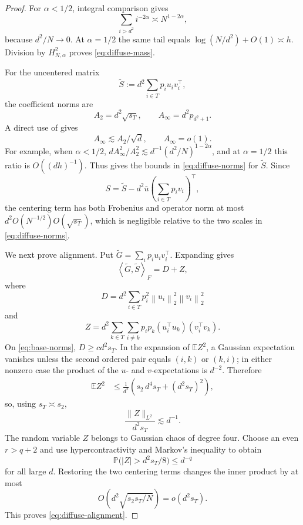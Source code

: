\documentclass[11pt]{article}
\theoremstyle{definition}
\newcommand{\Pp}{\mathbb P}
\newcommand{\Ee}{\mathbb E}
\newcommand{\ip}[2]{\left\langle #1,#2\right\rangle_F}
\newcommand{\norm}[1]{\left\lVert #1\right\rVert_2}
\begin{document}
\begin{proof}
For $\alpha<1/2$, integral comparison gives
\[
 \sum_{i>d^2}i^{-2\alpha}
 \asymp N^{1-2\alpha},
\]
because $d^2/N\to0$.  At $\alpha=1/2$ the same tail equals
$\log(N/d^2)+O(1)\asymp h$.  Division by
$H_{N,\alpha}^2$ proves \eqref{eq:diffuse-mass}.

For the uncentered matrix
\[
 \widetilde S:=d^2\sum_{i\in T}p_i u_iv_i^\top,
\]
the coefficient norms are
\[
 A_2=d^2\sqrt{s_T},
 \qquad A_\infty=d^2p_{d^2+1}.
\]
A direct use of  gives
\begin{equation}
 A_\infty\lesssim A_2/\sqrt d,
 \qquad A_\infty=o(1).
 \label{eq:diffuse-coefficients}
\end{equation}
For example, when $\alpha<1/2$,
$dA_\infty^2/A_2^2\lesssim d^{-1}(d^2/N)^{1-2\alpha}$, and at
$\alpha=1/2$ this ratio is $O((dh)^{-1})$.
Thus  gives the bounds in
\eqref{eq:diffuse-norms} for $\widetilde S$.  Since
\[
 S=\widetilde S-d^2\bar u
 \left(\sum_{i\in T}p_iv_i\right)^\top,
\]
the centering term has both Frobenius and operator norm at most
$d^2O(N^{-1/2})O(\sqrt{s_T})$, which is negligible relative to the two
scales in \eqref{eq:diffuse-norms}.

We next prove alignment.  Put
$\widetilde G=\sum_i p_i u_iv_i^\top$.  Expanding gives
\[
 \ip{\widetilde G}{\widetilde S}=D+Z,
\]
where
\[
 D=d^2\sum_{i\in T}p_i^2\norm{u_i}^2\norm{v_i}^2
\]
and
\[
 Z=d^2\sum_{k\in T}\sum_{i\neq k}
 p_ip_k(u_i^\top u_k)(v_i^\top v_k).
\]
On \eqref{eq:base-norms}, $D\geq c d^2s_T$.  In the expansion of
$\Ee Z^2$, a Gaussian expectation vanishes unless the second ordered
pair equals $(i,k)$ or $(k,i)$; in either nonzero case the product of
the $u$- and $v$-expectations is $d^{-2}$.  Therefore
\begin{align*}
 \Ee Z^2
 &\leq\frac1{d^2}
 \left(s_2\,d^4s_T+(d^2s_T)^2\right),
\end{align*}
so, using $s_T\asymp s_2$,
\[
 \frac{\|Z\|_{L^2}}{d^2s_T}\lesssim d^{-1}.
\]
The random variable $Z$ belongs to Gaussian chaos of degree four.
Choose an even $r>q+2$ and use hypercontractivity and Markov's
inequality to obtain
\[
 \Pp\bigl(|Z|>d^2s_T/8\bigr)\leq d^{-q}
\]
for all large $d$.  Restoring the two centering terms changes the inner
product by at most
\[
 O\!\left(d^2\sqrt{s_2s_T/N}\right)=o(d^2s_T).
\]
This proves \eqref{eq:diffuse-alignment}.


\end{proof}
\end{document}
